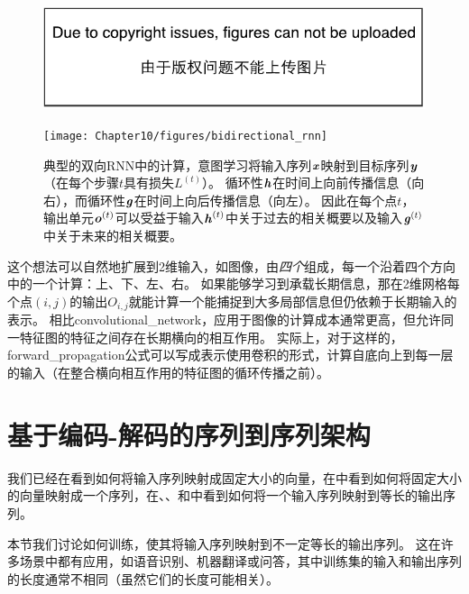 
\begin{figure}[!htb]
\ifOpenSource
\centerline{\includegraphics{figure.pdf}}
\else
\centerline{\texttt{[image: Chapter10/figures/bidirectional\_rnn]}}
\fi
\caption{典型的双向\gls{RNN}中的计算，意图学习将输入序列$\boldsymbol{\mathit{x}}$映射到目标序列$\boldsymbol{\mathit{y}}$（在每个步骤$t$具有损失$L^{(t)}$）。
循环性$\boldsymbol{\mathit{h}}$在时间上向前传播信息（向右），而循环性$\boldsymbol{\mathit{g}}$在时间上向后传播信息（向左）。
因此在每个点$t$，输出单元$\boldsymbol{\mathit{o}}^{(t)}$可以受益于输入$\boldsymbol{\mathit{h}}^{(t)}$中关于过去的相关概要以及输入$\boldsymbol{\mathit{g}}^{(t)}$中关于未来的相关概要。
}
\label{fig:chap10_bidirectional_rnn}
\end{figure}

这个想法可以自然地扩展到2维输入，如图像，由\emph{四个}组成，每一个沿着四个方向中的一个计算：上、下、左、右。
如果能够学习到承载长期信息，那在2维网格每个点$(i, j)$的输出$O_{i,j}$就能计算一个能捕捉到大多局部信息但仍依赖于长期输入的表示。
相比\gls{convolutional_network}，应用于图像的计算成本通常更高，但允许同一特征图的特征之间存在长期横向的相互作用\citep{Visin-et-al-arxiv2015-renet,kalchbrenner2015grid}。
实际上，对于这样的，\gls{forward_propagation}公式可以写成表示使用卷积的形式，计算自底向上到每一层的输入（在整合横向相互作用的特征图的循环传播之前）。


\section{基于编码-解码的序列到序列架构}
\label{sec:encoder_decoder_sequence_to_sequence_architectures}
我们已经在看到如何将输入序列映射成固定大小的向量，在中看到如何将固定大小的向量映射成一个序列，在、、和中看到如何将一个输入序列映射到等长的输出序列。

本节我们讨论如何训练，使其将输入序列映射到不一定等长的输出序列。
这在许多场景中都有应用，如语音识别、机器翻译或问答，其中训练集的输入和输出序列的长度通常不相同（虽然它们的长度可能相关）。

